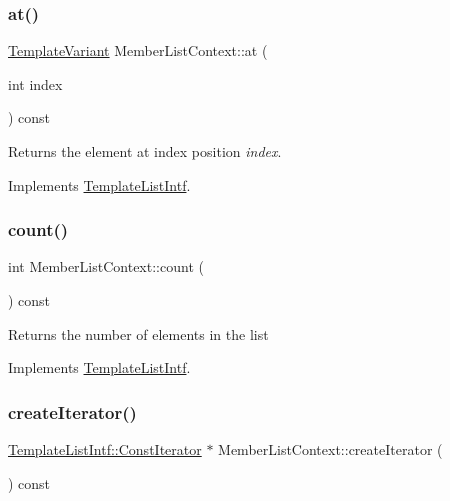 \mbox{\label{class_member_list_context_a89dbead5ee65a69041998b3f58a9cf30}} 
\subsubsection{\texorpdfstring{at()}{at()}}
{\footnotesize\ttfamily \mbox{\hyperlink{class_template_variant}{Template\+Variant}} Member\+List\+Context\+::at (\begin{DoxyParamCaption}\item[{int}]{index }\end{DoxyParamCaption}) const\hspace{0.3cm}{\ttfamily [virtual]}}

Returns the element at index position {\itshape index}. 

Implements \mbox{\hyperlink{class_template_list_intf_aa51e57e72eacf4e8ce1055ee30a0f7f8}{Template\+List\+Intf}}.

\mbox{\label{class_member_list_context_a1d77ef2461ae73437323716e0c7a9705}} 
\subsubsection{\texorpdfstring{count()}{count()}}
{\footnotesize\ttfamily int Member\+List\+Context\+::count (\begin{DoxyParamCaption}{ }\end{DoxyParamCaption}) const\hspace{0.3cm}{\ttfamily [virtual]}}

Returns the number of elements in the list 

Implements \mbox{\hyperlink{class_template_list_intf_a329e49e33484c2aa5106aac1bf4e5216}{Template\+List\+Intf}}.

\mbox{\label{class_member_list_context_af9e965557d0f61f3634cca3ba13c9524}} 
\subsubsection{\texorpdfstring{createIterator()}{createIterator()}}
{\footnotesize\ttfamily \mbox{\hyperlink{class_template_list_intf_1_1_const_iterator}{Template\+List\+Intf\+::\+Const\+Iterator}} $\ast$ Member\+List\+Context\+::create\+Iterator (\begin{DoxyParamCaption}{ }\end{DoxyParamCaption}) const\hspace{0.3cm}{\ttfamily [virtual]}}

